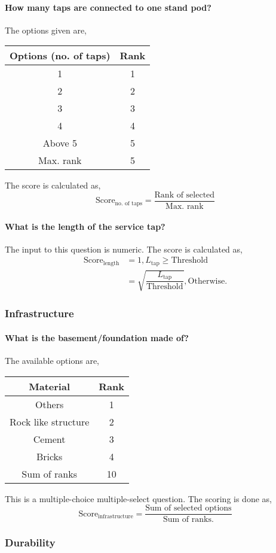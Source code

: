 \documentclass[oneside,twocolumn]{article}
\newcommand{\tsub}[2]{\text{#1}_{\text{#2}}}
\newcommand{\tsubb}[2]{#1_{\text{#2}}}
\newcommand{\dsub}[2]{\dfrac{\text{#1}}{\text{#2}}}
\newenvironment{ttable}
{
\begin{center}
\begin{tabular}{c|c}
\hline
}
{
\\ \hline
\end{tabular}
\end{center}
}
\begin{document}
\paragraph{How many taps are connected to one stand pod?}
The options given are,
\begin{ttable}
	Options (no. of taps) & Rank \\ \hline
	1 & 1 \\
	2 & 2 \\
	3 & 3 \\
	4 & 4 \\
	Above 5 & 5 \\ \hline
	Max. rank & 5 
\end{ttable}
The score is calculated as,
\[
	\tsub{Score}{no. of taps} = \dsub{Rank of selected}{Max. rank}
\]
\paragraph{What is the length of the service tap?}
The input to this question is numeric. The score is calculated as,
\begin{align*}
	\tsub{Score}{length} &= 1, \tsubb{L}{tap} \ge \text{Threshold} \\
	&= \sqrt{\dfrac{\tsubb{L}{tap}}{\text{Threshold}}}, \text{Otherwise}.
\end{align*}

\subsubsection{Infrastructure}
\paragraph{What is the basement/foundation made of?}
The available options are,
\begin{ttable}
	Material & Rank \\ \hline
	Others & 1 \\
	Rock like structure & 2 \\
	Cement & 3 \\
	Bricks & 4 \\ \hline
	Sum of ranks & 10 
\end{ttable}
This is a multiple-choice multiple-select question. The scoring is done as,
\[
	\tsub{Score}{infrastructure} = \dsub{Sum of selected options}{Sum of ranks.}
\]

\subsubsection{Durability}
\end{document}
